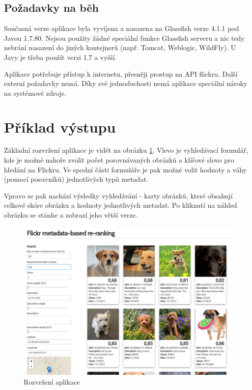 \documentclass[12pt,oneside,a4paper]{article}
\begin{document}
\subsection{Požadavky na běh}

Současná verze aplikace byla vyvíjena a nasazena na Glassfish verze 4.1.1 pod Javou 1.7.80. Nejsou použity žádné speciální funkce Glassfish serveru a nic tedy nebrání nasazení do jiných kontejnerů (např. Tomcat, Weblogic, WildFly). U Javy je třeba použít verzi 1.7 a vyšší.

Aplikace potřebuje přístup k internetu, přesněji prostup na API flickru. Další externí požadavky nemá. Díky své jednoduchosti nemá aplikace speciální nároky na systémové zdroje.


\section{Příklad výstupu}
Základní rozvržení aplikace je vidět na obrázku \ref{fig:layout}. Vlevo je vyhledávací formulář, kde je možné nahoře zvolit počet porovnávaných obrázků a klíčové slovo pro hledání na Flickru. Ve spodní části formuláře je pak možné volit hodnoty a váhy (pomocí posuvníků) jednotlivých typů metadat.

Vpravo se pak nachází výsledky vyhledávání - karty obrázků, které obsahují celkové skóre obrázku a hodnoty jednotlivých metadat. Po kliknutí na náhled obrázku se stánhe a zobrazí jeho větší verze.

\begin{figure}[H] \begin{center}
\includegraphics[width=13cm]{pics/layout.png} \caption{Rozvržení aplikace}
\label{fig:layout}
\end{center} \end{figure}
\end{document}
